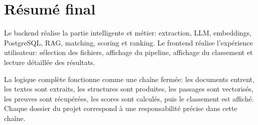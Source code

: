 \documentclass[12pt,a4paper]{article}
\begin{document}
\section{Résumé final}

Le backend réalise la partie intelligente et métier: extraction, LLM, embeddings, PostgreSQL, RAG, matching, scoring et ranking. Le frontend réalise l'expérience utilisateur: sélection des fichiers, affichage du pipeline, affichage du classement et lecture détaillée des résultats.

La logique complète fonctionne comme une chaîne fermée: les documents entrent, les textes sont extraits, les structures sont produites, les passages sont vectorisés, les preuves sont récupérées, les scores sont calculés, puis le classement est affiché. Chaque dossier du projet correspond à une responsabilité précise dans cette chaîne.
\end{document}
